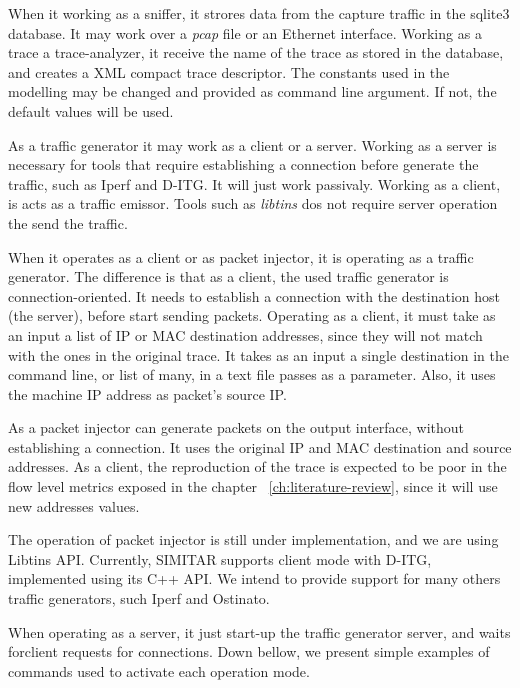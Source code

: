 When it working as a sniffer, it strores data from the capture traffic in the sqlite3 database. It may work over a \textit{pcap} file or an Ethernet interface. Working as a trace a trace-analyzer, it receive the name of the trace as stored in the database, and creates a XML compact trace descriptor. The constants used in the modelling may be changed and provided as command line argument. If not, the default values will be used. 

As a traffic generator it may work as a client or a server. Working as a server is necessary for tools that require establishing a connection before generate the traffic, such as Iperf and D-ITG. It will just work passivaly. Working as a client, is acts as a traffic emissor. Tools such as \textit{libtins} dos not require server operation the send the traffic. 

When it operates as a client or as packet injector, it is operating as a traffic generator. The difference is that as a client, the used traffic generator is connection-oriented. It needs to establish a connection with the destination host (the server), before start sending packets. Operating as a client, it must take as an input a list of IP or MAC destination addresses, since they will not match with the ones in the original trace. It takes as an input a single destination in the command line, or list of many, in a text file passes as a parameter. Also, it uses the machine IP address as packet's source IP.

 As a packet injector can generate packets on the output interface, without establishing a connection. It uses the original IP and MAC destination and source addresses. As a client, the reproduction of the trace is expected to be poor in the flow level metrics exposed in the chapter ~\ref{ch:literature-review}, since it will use new addresses values. 

The operation of packet injector is still under implementation, and we are using Libtins API. Currently, SIMITAR supports client mode with D-ITG, implemented using its C++ API. We intend to provide support for many others traffic generators, such Iperf and Ostinato.

When operating as a server, it just start-up the traffic generator server, and waits forclient requests for connections. Down bellow, we present simple examples of commands used to activate each operation mode.

